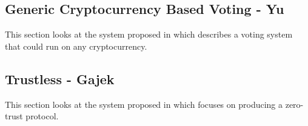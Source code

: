\subsection{Generic Cryptocurrency Based Voting - Yu}

This section looks at the system proposed in \cite{yuPlatformindependentSecureBlockchainBased2018} which describes a voting system that could run on any cryptocurrency.


\subsection{Trustless - Gajek}

This section looks at the system proposed in \cite{gajekTrustlessCensorshipResilientScalable2019} which focuses on producing a zero-trust protocol.


\newcommand*\YES{}
\newcommand*\NO{}

\newcommand*\NP{$n$}
\newcommand*\ALL{$Y$}
\newcommand*\SERVER{$Y_s$}
\newcommand*\REG{$Y_r$}
\newcommand*\SERVERREG{$Y_{rs}$}
\newcommand*\AUTH{$Y_a$}


